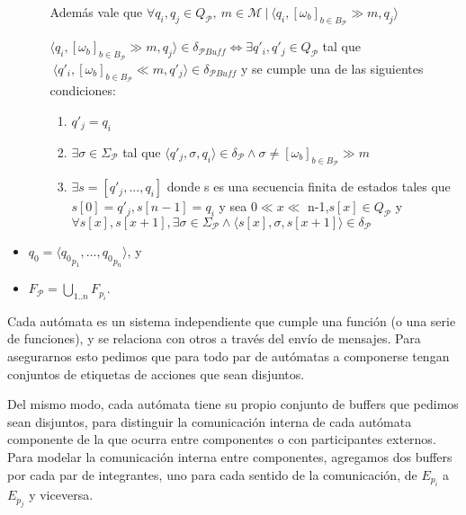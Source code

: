 \begin{definition}[Composición]
\begin{itemize}
\begin{enumerate}
Además vale que $\forall q_i,q_j \in Q_\mathit{\mathcal{P}}, \ m \in \mathcal{M} \ |	 \ \langle q_i, [\omega_\mathit{b}]_{b \in B_\mathcal{P}} \gg m, q_j \rangle$

$\langle q_i, [\omega_\mathit{b}]_{b \in B_\mathcal{P}} \gg m, q_j \rangle \in \delta_\mathit{\mathcal{P}Buff} \iff \exists q'_i, q'_j \in Q_\mathit{\mathcal{P}}$ tal que $\ \langle q'_i, [\omega_\mathit{b}]_{b \in B_\mathcal{P}} \ll m, q'_j \rangle \in \delta_\mathit{\mathcal{P}Buff}$ y se cumple una de las siguientes condiciones:
\begin{enumerate}
\item $q'_j = q_i$ 
\item $\exists \sigma \in \Sigma_\mathit{\mathcal{P}}$ tal que $\langle q'_j, \sigma, q_i \rangle \in \delta_\mathit{\mathcal{P}} \land \sigma \neq [\omega_\mathit{b}]_{b \in B_\mathcal{P}} \gg m $
\item $\exists s=[q'_j,...,q_i] $ donde s es una secuencia finita de estados tales que $s[0]= q'_j, s[n-1]=q_i$ y sea $ 0 \ll x \ll$ n-1,$s[x] \in Q_\mathit{\mathcal{P}}$ y $\forall s[x], s[x+1], \exists \sigma \in \Sigma_\mathit{\mathcal{P}} \land \langle s[x], \sigma, s[x+1] \rangle \in \delta_\mathit{\mathcal{P}} $  
\end{enumerate} 
\end{enumerate}
\item $q_0 = \langle {q_0}_{p_1}, \ldots, {q_0}_{p_n} \rangle$, y
\item $F_{\mathcal{P}} = \bigcup_{1..n} F_{p_i}$.
\end{itemize}
\end{definition}


Cada autómata es un sistema independiente que cumple una función (o una serie de funciones), y se relaciona con otros a través del envío de mensajes. Para asegurarnos esto pedimos que para todo par de autómatas a componerse tengan conjuntos de etiquetas de acciones que sean disjuntos. 

Del mismo modo, cada autómata tiene su propio conjunto de buffers que pedimos sean disjuntos, para distinguir la comunicación interna de cada autómata componente de la que ocurra entre componentes o con participantes externos. Para modelar la comunicación interna entre componentes, agregamos dos buffers por cada par de integrantes, uno para cada sentido de la comunicación, de $E_{p_i}$ a $E_{p_j}$ y viceversa.

